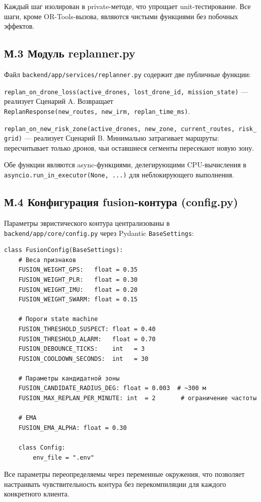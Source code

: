 \documentclass[14pt,a4paper]{extarticle}
\begin{document}
Каждый шаг изолирован в private-методе, что упрощает unit-тестирование. Все шаги, кроме OR-Tools-вызова, являются чистыми функциями без побочных эффектов.

\hypertarget{ux43c.3-ux43cux43eux434ux443ux43bux44c-replanner.py}{%
\subsection{М.3 Модуль replanner.py}\label{ux43c.3-ux43cux43eux434ux443ux43bux44c-replanner.py}}

Файл \texttt{backend/app/services/replanner.py} содержит две публичные функции:

\texttt{replan\_on\_drone\_loss(active\_drones,\ lost\_drone\_id,\ mission\_state)} --- реализует Сценарий A. Возвращает \texttt{ReplanResponse(new\_routes,\ new\_irm,\ replan\_time\_ms)}.

\texttt{replan\_on\_new\_risk\_zone(active\_drones,\ new\_zone,\ current\_routes,\ risk\_grid)} --- реализует Сценарий B. Минимально затрагивает маршруты: пересчитывает только дронов, чьи оставшиеся сегменты пересекают новую зону.

Обе функции являются async-функциями, делегирующими CPU-вычисления в \texttt{asyncio.run\_in\_executor(None,\ ...)} для неблокирующего выполнения.

\hypertarget{ux43c.4-ux43aux43eux43dux444ux438ux433ux443ux440ux430ux446ux438ux44f-fusion-ux43aux43eux43dux442ux443ux440ux430-config.py}{%
\subsection{М.4 Конфигурация fusion-контура (config.py)}\label{ux43c.4-ux43aux43eux43dux444ux438ux433ux443ux440ux430ux446ux438ux44f-fusion-ux43aux43eux43dux442ux443ux440ux430-config.py}}

Параметры эвристического контура централизованы в \texttt{backend/app/core/config.py} через Pydantic \texttt{BaseSettings}:

\begin{verbatim}
class FusionConfig(BaseSettings):
    # Веса признаков
    FUSION_WEIGHT_GPS:   float = 0.35
    FUSION_WEIGHT_PLR:   float = 0.30
    FUSION_WEIGHT_IMU:   float = 0.20
    FUSION_WEIGHT_SWARM: float = 0.15

    # Пороги state machine
    FUSION_THRESHOLD_SUSPECT: float = 0.40
    FUSION_THRESHOLD_ALARM:   float = 0.70
    FUSION_DEBOUNCE_TICKS:    int   = 3
    FUSION_COOLDOWN_SECONDS:  int   = 30

    # Параметры кандидатной зоны
    FUSION_CANDIDATE_RADIUS_DEG: float = 0.003  # ~300 м
    FUSION_MAX_REPLAN_PER_MINUTE: int  = 2       # ограничение частоты

    # EMA
    FUSION_EMA_ALPHA: float = 0.30

    class Config:
        env_file = ".env"
\end{verbatim}

Все параметры переопределяемы через переменные окружения, что позволяет настраивать чувствительность контура без перекомпиляции для каждого конкретного клиента.
\end{document}
